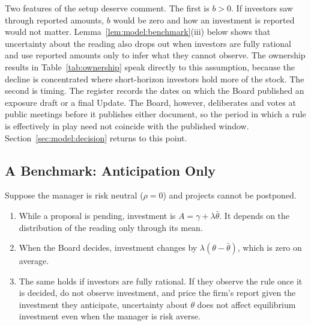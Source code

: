 Two features of the setup deserve comment. The first is $b>0$. If investors saw through reported amounts, $b$ would be zero and how an investment is reported would not matter. Lemma~\ref{lem:model:benchmark}(iii) below shows that uncertainty about the reading also drops out when investors are fully rational and use reported amounts only to infer what they cannot observe. The ownership results in Table~\ref{tab:ownership} speak directly to this assumption, because the decline is concentrated where short-horizon investors hold more of the stock. The second is timing. The register records the dates on which the Board published an exposure draft or a final Update. The Board, however, deliberates and votes at public meetings before it publishes either document, so the period in which a rule is effectively in play need not coincide with the published window. Section~\ref{sec:model:decision} returns to this point.

\subsection{A Benchmark: Anticipation Only}\label{sec:model:benchmark}

\begin{lemma}[Anticipation]\label{lem:model:benchmark}
Suppose the manager is risk neutral ($\rho=0$) and projects cannot be postponed.
\begin{enumerate}[label=(\roman*)]
  \item While a proposal is pending, investment is $A=\gamma+\lambda\bar\theta$. It depends on the distribution of the reading only through its mean.
  \item When the Board decides, investment changes by $\lambda(\theta-\bar\theta)$, which is zero on average.
  \item The same holds if investors are fully rational. If they observe the rule once it is decided, do not observe investment, and price the firm's report given the investment they anticipate, uncertainty about $\theta$ does not affect equilibrium investment even when the manager is risk averse.
\end{enumerate}
\end{lemma}

